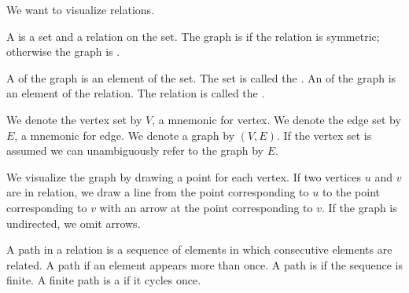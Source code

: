 
\sbasic



\sstart



We want to visualize relations.


A  is a set and a relation
on the set.
The graph is 
if the relation is symmetric; otherwise the
graph is .

A  of the graph is an element
of the set.
The set is called the .
An  of the graph is an element of
the relation.
The relation is called the .



We denote the vertex set by $V$, a mnemonic for
vertex.
We denote the edge set by $E$, a mnemonic for
edge.
We denote a graph by $(V, E)$.
If the vertex set is assumed we can
unambiguously refer to the graph by $E$.


We visualize the graph by drawing a
point for each vertex.
If two vertices $u$ and $v$ are in relation,
we draw a line from the point corresponding
to $u$ to the point corresponding to $v$ with
an arrow at the point corresponding to $v$.
If the graph is undirected, we omit arrows.


A path in a relation is a sequence of
elements in which consecutive elements
are related.
A path  if an element
appears more than once.
A path is  if the
sequence is finite.
A finite path is a  if it
cycles once.

\strats
